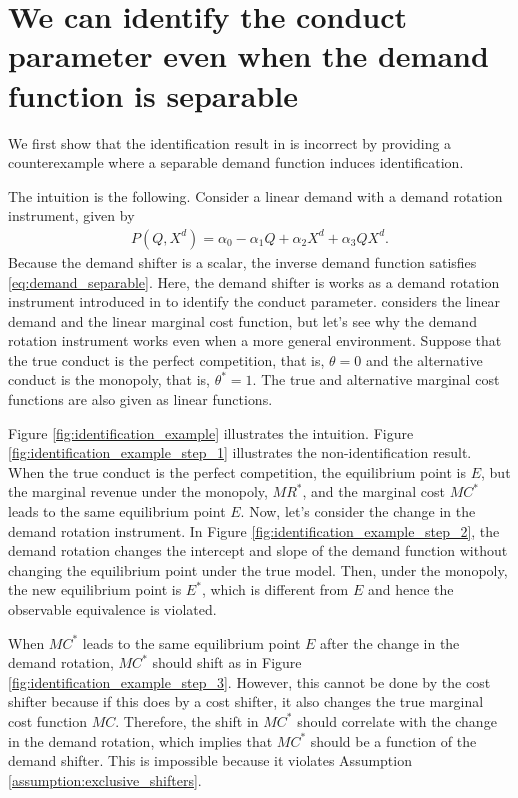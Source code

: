 \documentclass[11pt, a4paper]{article}
\theoremstyle{remark}
\begin{document}
\section{We can identify the conduct parameter even when the demand function is separable}\label{sec:identification_example}





We first show that the identification result in \citet{lau1982identifying} is incorrect by providing a counterexample where a separable demand function induces identification.

The intuition is the following.
Consider a linear demand with a demand rotation instrument, given by
\begin{align}
    P(Q, X^{d}) = \alpha_0 - \alpha_1Q + \alpha_2X^{d} + \alpha_3QX^{d}. \label{eq:demand_counterexample}
\end{align}
Because the demand shifter is a scalar, the inverse demand function satisfies \eqref{eq:demand_separable}.
Here, the demand shifter is works as a demand rotation instrument introduced in \citet{bresnahan1982oligopoly} to identify the conduct parameter.
\citet{bresnahan1982oligopoly} considers the linear demand and the linear marginal cost function, but let's see why the demand rotation instrument works even when a more general environment.
Suppose that the true conduct is the perfect competition, that is, $\theta = 0$ and the alternative conduct is the monopoly, that is, $\theta^{*} = 1$.
The true and alternative marginal cost functions are also given as linear functions.

Figure \ref{fig:identification_example} illustrates the intuition.
Figure \ref{fig:identification_example_step_1} illustrates the non-identification result.
When the true conduct is the perfect competition, the equilibrium point is $E$, but the marginal revenue under the monopoly, $MR^{*}$, and the marginal cost $MC^{*}$ leads to the same equilibrium point $E$.
Now, let's consider the change in the demand rotation instrument.
In Figure \ref{fig:identification_example_step_2}, the demand rotation changes the intercept and slope of the demand function without changing the equilibrium point under the true model.
Then, under the monopoly, the new equilibrium point is $E^{*}$, which is different from $E$ and hence the observable equivalence is violated.

When $MC^{*}$ leads to the same equilibrium point $E$ after the change in the demand rotation, $MC^{*}$ should shift as in Figure \ref{fig:identification_example_step_3}.
However, this cannot be done by the cost shifter because if this does by a cost shifter, it also changes the true marginal cost function $MC$.
Therefore, the shift in $MC^{*}$ should correlate with the change in the demand rotation, which implies that $MC^{*}$ should be a function of the demand shifter.
This is impossible because it violates Assumption \ref{assumption:exclusive_shifters}.
\end{document}
